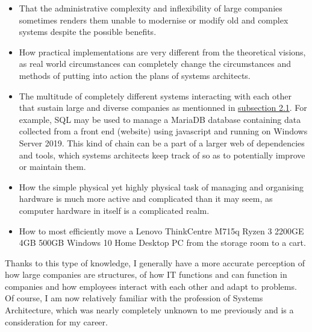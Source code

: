 \begin{itemize}
    \item That the administrative complexity and inflexibility of large companies sometimes renders them unable to modernise or modify old and complex systems despite the possible benefits.
    \item How practical implementations are very different from the theoretical visions, as real world circumstances can completely change the circumstances and methods of putting into action the plans of systems architects.
    \item The multitude of completely different systems interacting with each other that sustain large and diverse companies as mentionned in \hyperlink{subsection.2.1}{subsection 2.1}. For example, SQL may be used to manage a MariaDB database containing data collected from a front end (website) using javascript and running on Windows Server 2019. This kind of chain can be a part of a larger web of dependencies and tools, which systems architects keep track of so as to potentially improve or maintain them.
    \item How the simple physical yet highly physical task of managing and organising hardware is much more active and complicated than it may seem, as computer hardware in itself is a complicated realm. 
    \item How to most efficiently move a Lenovo ThinkCentre M715q Ryzen 3 2200GE 4GB 500GB Windows 10 Home Desktop PC from the storage room to a cart.
\end{itemize}

Thanks to this type of knowledge, I generally have a more accurate perception of how large companies are structures, of how IT functions and can function in companies and how employees interact with each other and adapt to problems. Of course, I am now relatively familiar with the profession of Systems Architecture, which was nearly completely unknown to me previously and is a consideration for my career.